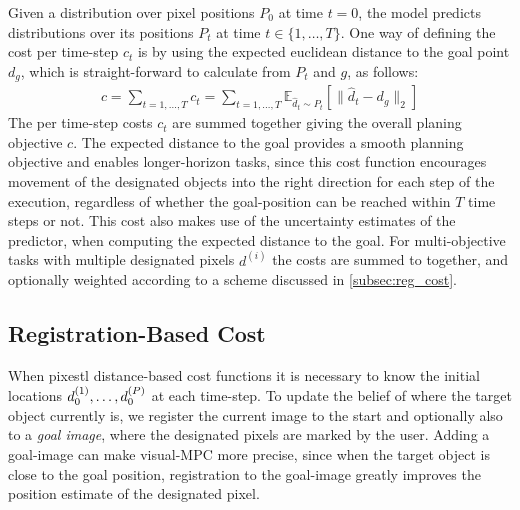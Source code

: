 Given a distribution over pixel positions $P_0$ at time $t = 0$, the model predicts distributions over its positions $P_t$ at time $t \in \{ 1, \dots, T \}$. One way of defining the cost per time-step $c_t$ is by using the expected euclidean distance to the goal point $d_g$, which is straight-forward to calculate from $P_t$ and $g$, as follows:
 \begin{align}
c = \sum_{t = 1, \dots, T} c_t =  \sum_{t = 1, \dots, T} \mathbb{E}_{\hat{d}_{t} \sim P_{t}} \left[\|\hat{d}_{t} - d_{g}\|_2\right] 
 \label{eq:cost}
 \end{align}
The per time-step costs $c_t$ are summed together giving the overall planing objective $c$. 
The expected distance to the goal provides a smooth planning objective and enables longer-horizon tasks, since this cost function encourages movement of the designated objects into the right direction for each step of the execution, regardless of whether the goal-position can be reached within $T$ time steps or not. This cost also makes use of the uncertainty estimates of the predictor, when computing the expected distance to the goal. For multi-objective tasks with multiple designated pixels $d^{(i)}$ the costs are summed to together, and optionally weighted according to a scheme discussed in \autoref{subsec:reg_cost}.  

\subsection{Registration-Based Cost}
\label{subsec:reg_cost}
When pixestl distance-based cost functions it is necessary to know the initial locations $d_0^{(1)}, \dots, d_0^{(P)}$ at each time-step. To update the belief of where the target object currently is, we register the current image to the start and optionally also to a \emph{goal image}, where the designated pixels are marked by the user. Adding a goal-image can make visual-MPC more precise, since when the target object is close to the goal position, registration to the goal-image greatly improves the position estimate of the designated pixel. 

